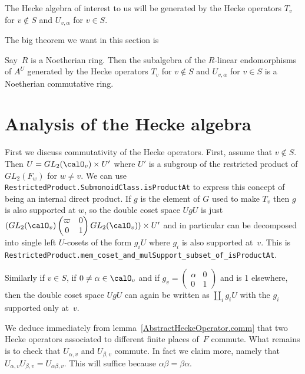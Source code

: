 The Hecke algebra of interest to us will be generated by the Hecke operators $T_v$ for $v\notin S$
and $U_{v,\alpha}$ for $v\in S$.

The big theorem we want in this section is
\begin{theorem}
  \label{nolean-hecke-algebra-commutative-noetherian}
  Say~$R$ is a Noetherian ring. Then the subalgebra of the $R$-linear endomorphisms
  of $A^U$ generated by the Hecke operators $T_v$ for $v\notin S$ and $U_{v,\alpha}$ for $v\in S$
  is a Noetherian commutative ring.
\end{theorem}

\section{Analysis of the Hecke algebra}

First we discuss commutativity of the Hecke operators. First, assume that $v\not\in S$.
Then $U=GL_2(\calO_v)\times U'$ where $U'$ is a subgroup of the restricted product
of $GL_2(F_w)$ for $w\not=v$. We can use {\tt RestrictedProduct.SubmonoidClass.isProductAt} to express this
concept of being an internal direct product. If $g$ is the element of $G$ used to make $T_v$ then
$g$ is also supported at $w$, so the double coset space $UgU$ is just
$(GL_2(\calO_v)\begin{pmatrix}\varpi&0\\0&1\end{pmatrix}GL_2(\calO_v))\times U'$
and in particular can be decomposed into single left $U$-cosets of the form $g_iU$
where $g_i$ is also supported at~$v$. This is {\tt RestrictedProduct.mem\_coset\_and\_mulSupport\_subset\_of\_isProductAt}.

Similarly if $v\in S$, if $0\not=\alpha\in\calO_v$ and if $g_v=\begin{pmatrix}\alpha&0\\0&1\end{pmatrix}$
and is 1 elsewhere, then the double coset space $UgU$ can again be written as $\coprod_i g_iU$
with the $g_i$ supported only at~$v$.

We deduce immediately from lemma~\ref{AbstractHeckeOperator.comm} that two Hecke operators
associated to different finite places of~$F$ commute.
What remains is to check that $U_{\alpha,v}$ and $U_{\beta,v}$ commute. In fact we claim
more, namely that $U_{\alpha,v}U_{\beta,v}=U_{\alpha\beta,v}$. This will suffice
because $\alpha\beta=\beta\alpha$.

